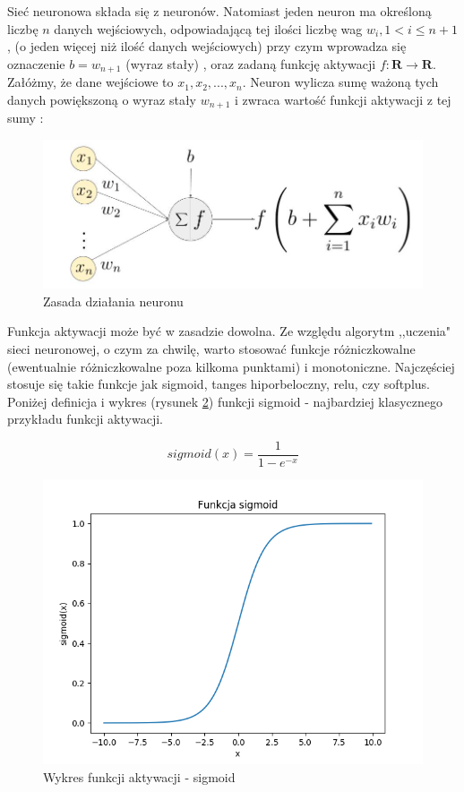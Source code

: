 \documentclass[licencjacka]{pracamgr}
\begin{document}
Sieć neuronowa składa się z neuronów. Natomiast jeden neuron ma określoną liczbę $n$ danych wejściowych, odpowiadającą tej ilości liczbę wag $w_{i}, 1 < i\leq n+1$, (o jeden więcej niż ilość danych wejściowych) przy czym wprowadza się 
oznaczenie  $b=w_{n+1}$ (wyraz stały)  , oraz zadaną funkcję aktywacji $f:\mathbf{R}\rightarrow\mathbf{R}$.  Załóżmy, że dane wejściowe to $x_{1}, x_{2},...,x_{n}$.  Neuron wylicza sumę ważoną tych danych powiększoną o wyraz stały $w_{n+1}$ i zwraca wartość funkcji aktywacji z tej sumy :

\begin{figure}[h!]
	\includegraphics [scale=0.2]{neuron.png}
	\caption{Zasada działania neuronu}
	\label{Rys20}
\end{figure}


Funkcja aktywacji może być w zasadzie dowolna. Ze względu algorytm ,,uczenia" sieci neuronowej, o czym za chwilę, warto stosować funkcje różniczkowalne (ewentualnie różniczkowalne poza kilkoma punktami) i monotoniczne. Najczęściej stosuje się takie funkcje jak sigmoid, tanges hiporbeloczny, relu, czy softplus.  Poniżej definicja i wykres (rysunek \ref{Rys21}) funkcji sigmoid - najbardziej klasycznego przykładu funkcji aktywacji.

$$sigmoid(x) = \frac{1}{1-e^{-x}}$$
\begin{figure}[h!]
	\includegraphics [scale=0.5]{sigmoid.png}
	\caption{Wykres funkcji aktywacji - sigmoid}
	\label{Rys21}
\end{figure}
\end{document}
